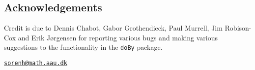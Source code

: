 \hypertarget{acknowledgements}{%
\subsection{Acknowledgements}\label{acknowledgements}}

Credit is due to Dennis Chabot, Gabor Grothendieck, Paul Murrell, Jim
Robison-Cox and Erik Jørgensen for reporting various bugs and making
various suggestions to the functionality in the \texttt{doBy} package.




\address{%
Søren Højsgaard\\
Department of Mathematical Sciences, Aalborg University, Denmark\\
Skjernvej 4A\\ 9220 Aalborg Ø, Denmark\\
}
\href{mailto:sorenh@math.aau.dk}{\nolinkurl{sorenh@math.aau.dk}}

